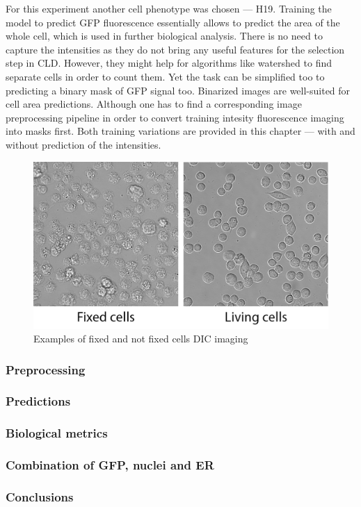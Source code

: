     For this experiment another cell phenotype was chosen --- H19. Training the model to predict GFP fluorescence essentially allows to predict the area of the whole cell, which is used in further biological analysis. There is no need to capture the intensities as they do not bring any useful features for the selection step in CLD. However, they might help for algorithms like watershed to find separate cells in order to count them. Yet the task can be simplified too to predicting a binary mask of GFP signal too. Binarized images are well-suited for cell area predictions. Although one has to find a corresponding image preprocessing pipeline in order to convert training intesity fluorescence imaging into masks first. Both training variations are provided in this chapter --- with and without prediction of the intensities. 
    \begin{figure}[H]
        \begin{center}
            \includegraphics[width=0.5\linewidth]{bilder/gfp/fixed-not-fixed.png}
            \caption{Examples of fixed and not fixed cells DIC imaging}\label{fig:fixed-not-fixed}
        \end{center}
    \end{figure}
    \subsubsection{Preprocessing}
        
    \subsubsection{Predictions}
        
    \subsubsection{Biological metrics}
        
    \subsubsection{Combination of GFP, nuclei and ER}
        
    \subsubsection{Conclusions}
        

